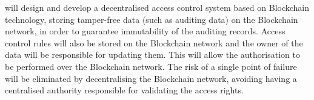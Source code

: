 \begin{Workpackage}{\thewpno}
\begin{Task}
\TaskResults{%
\ref{del:auth2},
\ref{del:auth3},
\ref{del:auth4}
}
\TaskHeader{}
\theTask{} will design and develop a decentralised access control system based on Blockchain technology, storing tamper-free data (such as auditing data) on the Blockchain network, in order to guarantee immutability of the auditing records. Access control rules will also be stored on the Blockchain network and the owner of the data will be responsible for updating them. This will allow the authorisation to be performed over the Blockchain network.
The risk of a single point of failure will be eliminated by decentralising the Blockchain network, avoiding having a centralised authority responsible for validating the access rights. %

\end{Task}
\end{Workpackage}
